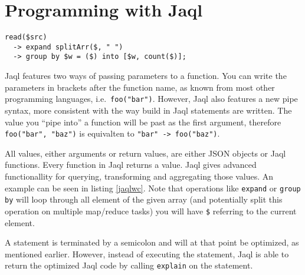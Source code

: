 \section{Programming with Jaql} 

\begin{lstlisting}[language=jaql,caption=Wordcount in Jaql,float,label=jaqlwc]
read($src)
  -> expand splitArr($, " ")
  -> group by $w = ($) into [$w, count($)];
\end{lstlisting}

Jaql features two ways of passing parameters to a function. You can write the parameters
in brackets after the function name, as known from most other programming languages, i.e.\
\lstinline[language=jaql]!foo("bar")!. However, Jaql also features a new pipe syntax, more
consistent with the way build in Jaql statements are written. The value you ``pipe into''
a function will be past as the first argument, therefore \lstinline[language=jaql]!foo("bar", "baz")!
is equivalten to \lstinline[language=jaql]!"bar" -> foo("baz")!.

All values, either arguments or return values, are either JSON objects or Jaql functions.
Every function in Jaql returns a value. Jaql gives advanced functionallity for querying, transforming
and aggregating those values. An example can be seen in listing \ref{jaqlwc}. Note that
operations like {\tt expand} or {\tt group by} will loop through all element of the given array
(and potentially split this operation on multiple map/reduce tasks) you will have {\tt\$} referring
to the current element.

A statement is terminated by a semicolon and will at that point be optimized, as mentioned earlier.
However, instead of executing the statement, Jaql is able to return the optimized Jaql code by calling
{\tt explain} on the statement.